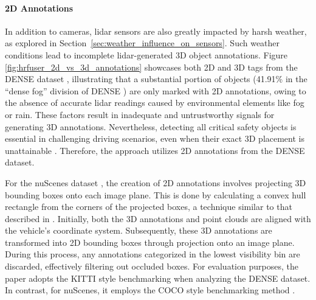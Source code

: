 \documentclass[report.tex]{subfiles}
\begin{document}
    \paragraph*{2D Annotations}
    
    In addition to cameras, lidar sensors are also greatly impacted by harsh weather, as explored in Section~\ref{sec:weather_influence_on_sensors}. Such weather conditions lead to incomplete lidar-generated 3D object annotations. Figure \ref{fig:hrfuser_2d_vs_3d_annotations} showcases both 2D and 3D tags from the DENSE dataset \cite{bijelic2020seeing}, illustrating that a substantial portion of objects (41.91\% in the “dense fog” division of DENSE \cite{bijelic2020seeing}) are only marked with 2D annotations, owing to the absence of accurate lidar readings caused by environmental elements like fog or rain. These factors result in inadequate and untrustworthy signals for generating 3D annotations. Nevertheless, detecting all critical safety objects is essential in challenging driving scenarios, even when their exact 3D placement is unattainable \cite{broedermann2022hrfuser}. Therefore, the approach utilizes 2D annotations from the DENSE dataset. 
    
    For the nuScenes dataset \cite{caesar2020nuscenes}, the creation of 2D annotations involves projecting 3D bounding boxes onto each image plane. This is done by calculating a convex hull rectangle from the corners of the projected boxes, a technique similar to that described in \cite{nabati2020radar}. Initially, both the 3D annotations and point clouds are aligned with the vehicle's coordinate system. Subsequently, these 3D annotations are transformed into 2D bounding boxes through projection onto an image plane. During this process, any annotations categorized in the lowest visibility bin are discarded, effectively filtering out occluded boxes. For evaluation purposes, the paper adopts the KITTI style benchmarking \cite{geiger2012we} when analyzing the DENSE dataset. In contrast, for nuScenes, it employs the COCO style benchmarking method \cite{lin2014microsoft}.
\end{document}
